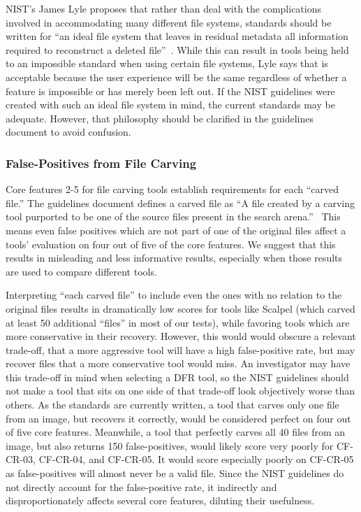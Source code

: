 \begin{paraphrase}
NIST's James Lyle proposes that rather than deal with the complications involved in accommodating 
many different file systems, standards should be written for ``an ideal file system that leaves in 
residual metadata  all  information  required  to  reconstruct  a  deleted  file''~\cite{lyle2011-ICDF2C}. 
While this can result in tools being held to an impossible standard when using certain file systems, 
Lyle says that is acceptable because the user experience will be the same regardless of whether a feature is impossible or has merely been left out.
If the NIST guidelines were created with such an ideal file system in mind, the current standards may be adequate.
However, that philosophy should be clarified in the guidelines document to avoid confusion.
\end{paraphrase}



\subsubsection{False-Positives from File Carving} \label{sec:false_pos}

Core features 2-5 for file carving tools establish requirements for each ``carved file.''
The guidelines document defines a carved file as ``A file created by a carving tool purported to be one of the source files present in the search arena.''~\cite{carving_standards}
This means even false positives which are not part of one of the original files affect a tools' evaluation on four out of five of the core features.
We suggest that this results in misleading and less informative results, especially when those results are used to compare different tools.
 
Interpreting ``each carved file'' to include even the ones with no relation to the original files results in dramatically low scores for tools like Scalpel (which carved at least 50 additional ``files'' in most of our tests), while favoring tools which are more conservative in their recovery.
However, this would would obscure a relevant trade-off, that a more aggressive tool will have a high false-positive rate, but may recover files that a more conservative tool would miss.
An investigator may have this trade-off in mind when selecting a DFR tool, so the NIST guidelines should not make a tool that sits on one side of that trade-off look objectively worse than others.
As the standards are currently written, a tool that carves only one file from an image, but recovers it correctly, would be considered perfect on four out of five core features.
Meanwhile, a tool that perfectly carves all 40 files from an image, but also returns 150 false-positives, would likely score very poorly for CF-CR-03, CF-CR-04, and CF-CR-05.
It would score especially poorly on CF-CR-05 as false-positives will almost never be a valid file.
Since the NIST guidelines do not directly account for the false-positive rate, it indirectly and disproportionately affects several core features, diluting their usefulness.

